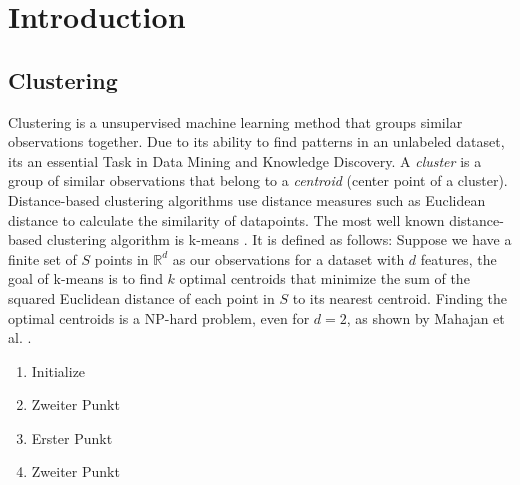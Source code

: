 \chapter{Introduction}


\section{Clustering}

Clustering is a unsupervised machine learning method that groups similar observations together. Due to its ability to find patterns in an unlabeled dataset, its an essential Task in Data Mining and Knowledge Discovery. A \textit{cluster} is a group of similar observations that belong to a \textit{centroid} (center point of a cluster). Distance-based clustering algorithms use distance measures such as Euclidean distance to calculate the similarity of datapoints. The most well known distance-based clustering algorithm is k-means \cite{kmeans}. It is defined as follows: Suppose we have a finite set of $S$ points in $\mathbb{R}^d$ as our observations for a dataset with $d$ features, the goal of k-means is to find $k$ optimal centroids that minimize the sum of the squared Euclidean distance of each point in $S$ to its nearest centroid. Finding the optimal centroids is a NP-hard problem, even for $d=2$, as shown by Mahajan et al. \cite{kmeans_np_hard}.






\begin{enumerate} 
	\item Initialize 
	\item Zweiter Punkt
	\item Erster Punkt
	\item Zweiter Punkt
\end{enumerate}